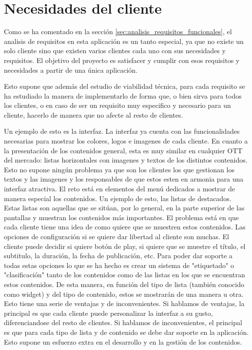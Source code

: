 \section{Necesidades del cliente}
\label{sec:analisis_necesidades_cliente}

Como se ha comentado en la sección \ref{sec:analisis_requisitos_funcionales}, el analisis de requisitos
en esta aplicación es un tanto especial, ya que no existe un solo cliente sino que existen varios clientes
cada uno con sus necesidades y requisitos. El objetivo del proyecto es satisfacer y cumplir con esos 
requisitos y necesidades a partir de una única aplicación. 

Esto supone que además del estudio de viabilidad técnica, para cada requisito se ha estudiado la manera
de implementarlo de forma que, o bien sirva para todos los clientes, o en caso de ser un requisito 
muy especifico y necesario para un cliente, hacerlo de manera que no afecte al resto de clientes.

Un ejemplo de esto es la interfaz. La interfaz ya cuenta con las funcionalidades necesarias para mostrar
los colores, logos e imagenes de cada cliente. En cuanto a la presentación de los contenidos general, esta es muy similar
en cualquier OTT del mercado: listas horizontales con imagenes y textos de los distintos contenidos. Esto 
no supone ningún problema ya que son los clientes los que gestionan los textos y las imagenes y los responsables
de que estos esten en armonia para una interfaz atractiva. El reto está en elementos del menú dedicados a mostrar
de manera especial los contenidos. Un ejemplo de esto, las listas de destacados. Estas listas son aquellas que se sitúan,
por lo general, en la parte superior de las pantallas y muestran los contenidos más importantes. El problema está en que
cada cliente tiene una idea de como quiere que se muestren estos contenidos. Las opciones de configuración si se quiere
dar libertad al cliente son muchas. El cliente puede decidir si quiere botón de play, si quiere que se muestre el título,
el subtitulo, la duración, la fecha de publicación, etc. Para poder dar soporte a todas estas opciones lo que se ha hecho
es crear un sistema de "etiquetado" o "clasificación" tanto de los contenidos como de las listas en los que se encuentran
estos contenidos. De esta manera, en función del tipo de lista (también conocido como widget) y del tipo de contenido,
estos se mostrarán de una manera u otra. Esto tiene una serie de ventajas y de inconvenientes. Si hablamos de ventajas,
la principal es que cada cliente puede personalizar la interfaz a su gusto, diferenciandose del resto de clientes.
Si hablamos de inconvenientes, el principal es que para cada tipo de lista y de contenido se debe dar soporte en la aplicación.
 Esto supone un esfuerzo extra en el desarrollo y en la gestión de los contenidos. 

